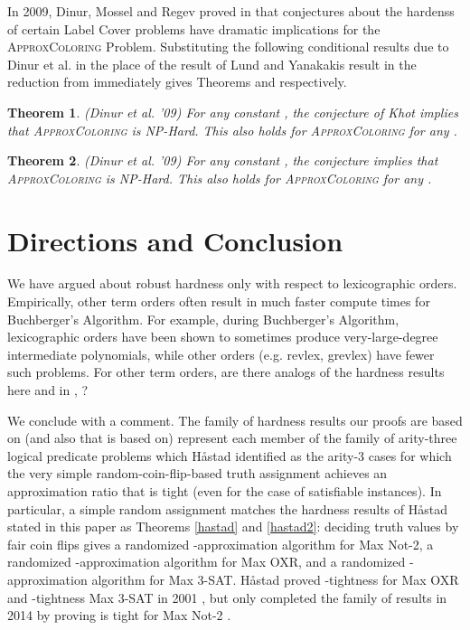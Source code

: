 \documentclass{article}
\newtheorem{theorem}{Theorem}[]
\begin{document}
In 2009, Dinur, Mossel and Regev proved in \citep{dinur} that conjectures about the hardenss of certain Label Cover problems have dramatic implications for the \textsc{ApproxColoring} Problem. Substituting the following conditional results due to Dinur et al. in the place of the result of Lund and Yanakakis result in the reduction from \citep{RS} immediately gives Theorems  and  respectively.

\begin{theorem} (Dinur et al. '09)
For any constant , the  conjecture of Khot implies that \textsc{ApproxColoring} is NP-Hard. This also holds for \textsc{ApproxColoring} for any .
\end{theorem}

\begin{theorem} (Dinur et al. '09)
For any constant , the  conjecture implies that \textsc{ApproxColoring} is NP-Hard. This also holds for \textsc{ApproxColoring} for any .
\end{theorem}





\section{Directions and Conclusion}

We have argued about robust hardness only with respect to lexicographic orders. Empirically, other term orders often result in much faster compute times for Buchberger's Algorithm. For example, during Buchberger's Algorithm, lexicographic orders have been shown to sometimes produce very-large-degree intermediate polynomials, while other orders (e.g. revlex, grevlex) have fewer such problems. For other term orders, are there analogs of the hardness results here and in \citep{deloera}, \citep{RS}?

We conclude with a comment.  The family of hardness results our proofs are based on (and also that \citep{RS} is based on) represent each member of the family of arity-three logical predicate problems which H{\aa}stad identified as the arity-3 cases for which the very simple random-coin-flip-based truth assignment achieves an approximation ratio that is tight (even for the case of satisfiable instances). In particular, a simple random assignment matches the hardness results of H{\aa}stad stated in this paper as Theorems \ref{hastad} and \ref{hastad2}: deciding truth values by fair coin flips gives a randomized -approximation algorithm for Max Not-2, a randomized -approximation algorithm for Max OXR, and a randomized -approximation algorithm for Max 3-SAT. H{\aa}stad proved -tightness for Max OXR and -tightness Max 3-SAT in 2001 \citep{hast01}, but only completed the family of results in 2014 by proving  is tight for Max Not-2 \citep{hast14}.
\end{document}
